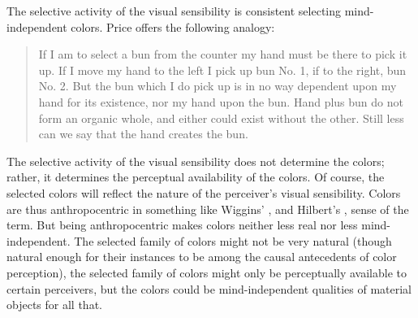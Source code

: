 \documentclass[12pt]{article}
\begin{document}
The selective activity of the visual sensibility is consistent selecting mind-independent colors. Price offers the following analogy: 
\begin{quote}
	If I am to select a bun from the counter my hand must be there to pick it up. If I move my hand to the left I pick up bun No. 1, if to the right, bun No. 2. But the bun which I do pick up is in no way dependent upon my hand for its existence, nor my hand upon the bun. Hand plus bun do not form an organic whole, and either could exist without the other. Still less can we say that the hand creates the bun. \citep[40]{Price:1932fk} 
\end{quote}
The selective activity of the visual sensibility does not determine the colors; rather, it determines the perceptual availability of the colors. Of course, the selected colors will reflect the nature of the perceiver's visual sensibility. Colors are thus anthropocentric in something like Wiggins' \citeyearpar{Wiggins:1987ta}, and Hilbert's \citeyearpar{Hilbert:1987jq}, sense of the term. But being anthropocentric makes colors neither less real nor less mind-independent. The selected family of colors might not be very natural (though natural enough for their instances to be among the causal antecedents of color perception), the selected family of colors might only be perceptually available to certain perceivers, but the colors could be mind-independent qualities of material objects for all that.
\end{document}
